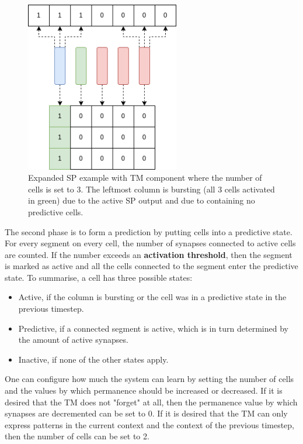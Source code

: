 \begin{figure}[H]
    \centering
    \includegraphics[width=0.6\textwidth]{resources/related_works/tm_vis1.png}
    \caption{Expanded SP example with TM component where the number of cells is set to 3. The leftmost column is bursting (all 3 cells activated in green) due to the active SP output and due to containing no predictive cells.}
    \label{fig:tm_vis1}
\end{figure}
\par
The second phase is to form a prediction by putting cells into a predictive state. For every segment on every cell, the number of synapses connected to active cells are counted. If the number exceeds an \textbf{activation threshold}, then the segment is marked as active and all the cells connected to the segment enter the predictive state. To summarise, a cell has three possible states:
\begin{itemize}
    \item Active, if the column is bursting or the cell was in a predictive state in the previous timestep.
    \item Predictive, if a connected segment is active, which is in turn determined by the amount of active synapses.
    \item Inactive, if none of the other states apply.
\end{itemize}
One can configure how much the system can learn by setting the number of cells and the values by which permanence should be increased or decreased. If it is desired that the TM does not "forget" at all, then the permanence value by which synapses are decremented can be set to 0. If it is desired that the TM can only express patterns in the current context and the context of the previous timestep, then the number of cells can be set to 2.
